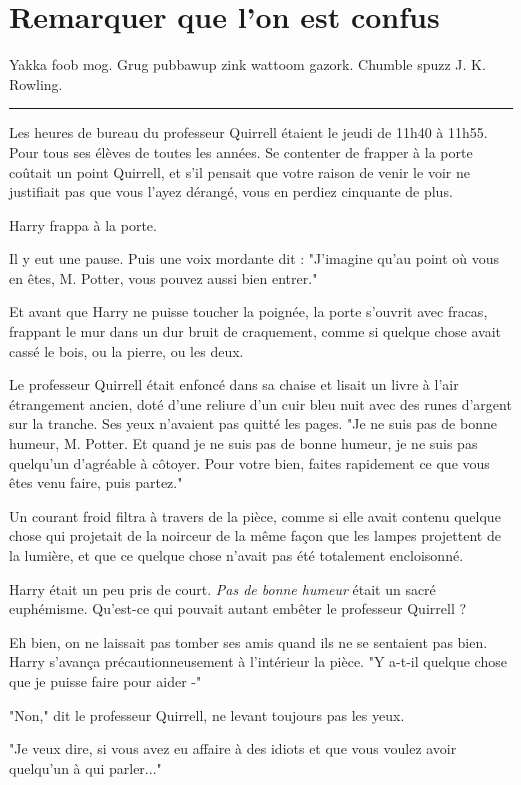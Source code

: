 
\chapter{Remarquer que l'on est confus}

Yakka foob mog. Grug pubbawup zink wattoom gazork. Chumble spuzz J. K. Rowling.
\par\noindent\rule{\textwidth}{0.4pt}
Les heures de bureau du professeur Quirrell étaient le jeudi de 11h40 à 11h55. Pour tous ses élèves de toutes les années. Se contenter de frapper à la porte coûtait un point Quirrell, et s'il pensait que votre raison de venir le voir ne justifiait pas que vous l'ayez dérangé, vous en perdiez cinquante de plus.

Harry frappa à la porte.

Il y eut une pause. Puis une voix mordante dit : "J'imagine qu'au point où vous en êtes, M. Potter, vous pouvez aussi bien entrer."

Et avant que Harry ne puisse toucher la poignée, la porte s'ouvrit avec fracas, frappant le mur dans un dur bruit de craquement, comme si quelque chose avait cassé le bois, ou la pierre, ou les deux.

Le professeur Quirrell était enfoncé dans sa chaise et lisait un livre à l'air étrangement ancien, doté d'une reliure d'un cuir bleu nuit avec des runes d'argent sur la tranche. Ses yeux n'avaient pas quitté les pages. "Je ne suis pas de bonne humeur, M. Potter. Et quand je ne suis pas de bonne humeur, je ne suis pas quelqu'un d'agréable à côtoyer. Pour votre bien, faites rapidement ce que vous êtes venu faire, puis partez."

Un courant froid filtra à travers de la pièce, comme si elle avait contenu quelque chose qui projetait de la noirceur de la même façon que les lampes projettent de la lumière, et que ce quelque chose n'avait pas été totalement encloisonné.

Harry était un peu pris de court. \emph{Pas de bonne humeur}  était un sacré euphémisme. Qu'est-ce qui pouvait autant embêter le professeur Quirrell ?

Eh bien, on ne laissait pas tomber ses amis quand ils ne se sentaient pas bien. Harry s'avança précautionneusement à l'intérieur la pièce. "Y a-t-il quelque chose que je puisse faire pour aider -"

"Non," dit le professeur Quirrell, ne levant toujours pas les yeux.

"Je veux dire, si vous avez eu affaire à des idiots et que vous voulez avoir quelqu'un à qui parler..."

